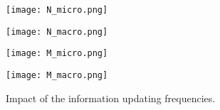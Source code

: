 \documentclass[conference]{IEEEtran}
\begin{document}
\begin{itemize}
\begin{figure*}[t]
\centering
\begin{minipage}[b]{0.25\linewidth}
\centering 
\texttt{[image: N\_micro.png]}
\end{minipage}\begin{minipage}[b]{0.25\linewidth}
\centering 
\texttt{[image: N\_macro.png]}
\end{minipage}\begin{minipage}[b]{0.25\linewidth}
\centering 
\texttt{[image: M\_micro.png]}
\end{minipage}\begin{minipage}[b]{0.25\linewidth}
\centering 
\texttt{[image: M\_macro.png]}
\end{minipage}\caption{Impact of the information updating frequencies.}
\end{figure*}
    
  



\end{itemize}
\end{document}
